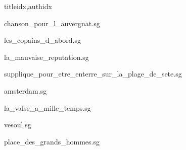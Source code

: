 \documentclass[
    ]{article}
\begin{document}
\begin{songs}{titleidx,authidx}

{chanson_pour_l_auvergnat.sg}


{les_copains_d_abord.sg}


{la_mauvaise_reputation.sg}


{supplique_pour_etre_enterre_sur_la_plage_de_sete.sg}


{amsterdam.sg}


{la_valse_a_mille_temps.sg}


{vesoul.sg}


{place_des_grands_hommes.sg}



\end{songs}
\end{document}
